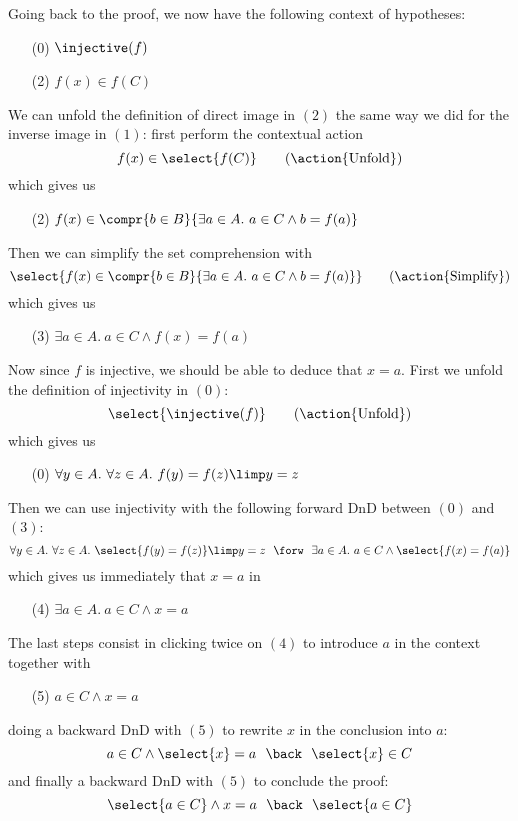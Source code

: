 Going back to the proof, we now have the following context of hypotheses:
\begin{itemize}
  \item[(0)] $\injective(f)$
  \item[(2)] $f(x) \in f(C)$
\end{itemize}
We can unfold the definition of direct image in $(2)$ the same way we did for
the inverse image in $(1)$: first perform the contextual action
$$f(x) \in \select{f(C)} \qquad \text{(\action{Unfold})}$$
which gives us
\begin{itemize}
  \item[(2)] $f(x) \in \compr{b \in B}{\exists a \in A.\ a \in C \land b = f(a)}$
\end{itemize}
Then we can simplify the set comprehension with
$$\select{f(x) \in \compr{b \in B}{\exists a \in A.\ a \in C \land b = f(a)}} \qquad \text{(\action{Simplify})}$$
which gives us
\begin{itemize}
  \item[(3)] $\exists a \in A.\ a \in C \land f(x) = f(a)$
\end{itemize}
Now since $f$ is injective, we should be able to deduce that $x = a$. First we
unfold the definition of injectivity in $(0)$:
$$\select{\injective(f)} \qquad \text{(\action{Unfold})}$$
which gives us
\begin{itemize}
  \item[(0)] $\forall y \in A.\ \forall z \in A.\ f(y) = f(z) \limp y = z$
\end{itemize}
Then we can use injectivity with the following forward DnD between $(0)$ and
$(3)$:
$$\forall y \in A.\ \forall z \in A.\ \select{f(y) = f(z)} \limp y = z ~~\forw~~ \exists a \in A.\ a \in C \land \select{f(x) = f(a)}$$
which gives us immediately that $x = a$ in
\begin{itemize}
  \item[(4)] $\exists a \in A.\ a \in C \land x = a$
\end{itemize}
The last steps consist in clicking twice on $(4)$ to introduce $a$ in the
context together with
\begin{itemize}
  \item[(5)] $a \in C \land x = a$
\end{itemize}
doing a backward DnD with $(5)$ to rewrite $x$ in the conclusion into $a$:
$$a \in C \land \select{x} = a ~~\back~~ \select{x} \in C$$
and finally a backward DnD with $(5)$ to conclude the proof:
$$\select{a \in C} \land x = a ~~\back~~ \select{a \in C}$$


